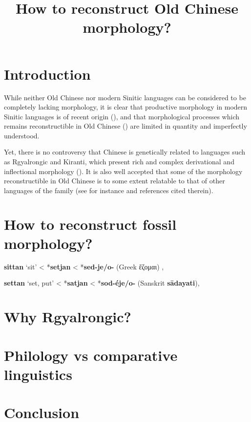 \documentclass[oneside,a4paper,11pt]{article}
\newcommand{\ipa}[1]{\textbf{{\phon\mbox{#1}}}} %
\newcommand{\grec}[1]{{\mleccha #1}}
\begin{document}
\title{How to reconstruct Old Chinese morphology?}

\section*{Introduction}
While neither Old Chinese nor modern Sinitic languages can be considered to be completely lacking morphology, it is clear that productive morphology in modern Sinitic languages is of recent origin (\citealt{arcodia15typology}), and that morphological processes which remains reconstructible in Old Chinese (\citealt{sagart99roc}) are limited in quantity and imperfectly understood.

Yet, there is no controversy that Chinese is genetically related to languages such as Rgyalrongic and Kiranti, which present rich and complex derivational and inflectional morphology (\citealt{jacques13harmonization}). It is also well accepted that some of the morphology reconstructible in Old Chinese is to some extent relatable to that of other languages of the family (see for instance \citealt{sagart12sprefix} and references cited therein). 
 

\section{How to reconstruct fossil morphology?} 


\ipa{sittan} `sit' < *\ipa{setjan} < *\ipa{sed-je/o-} (Greek \grec{ἕζομαι})
\citet[434]{kroonen13dict}, \citet[514, n.7]{liv}

\ipa{settan} `set, put' < *\ipa{satjan} < *\ipa{sod-éje/o-} (Sanskrit \ipa{sādayati}), \citet[427]{kroonen13dict}



\section{Why Rgyalrongic?}

\section{Philology vs comparative linguistics}


\section*{Conclusion}


\end{document}
